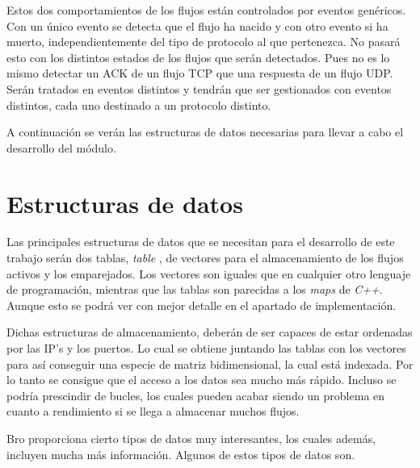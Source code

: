 \intro Estos dos comportamientos de los flujos están controlados por eventos genéricos. Con un único evento se 
detecta que el flujo ha nacido y con otro evento si ha muerto, independientemente del tipo de protocolo al que 
pertenezca. No pasará esto con los distintos estados de los flujos que serán detectados. Pues no es lo mismo 
detectar un ACK de un flujo TCP que una respuesta de un flujo UDP. Serán tratados en eventos distintos y tendrán que ser gestionados con eventos distintos, cada uno destinado a un protocolo distinto. 

\intro A continuación se verán las estructuras de datos necesarias para llevar a cabo el desarrollo del módulo.

\section{Estructuras de datos}

Las principales estructuras de datos que se necesitan para el desarrollo de este trabajo serán dos 
tablas, \textit{table} \cite{brotable}, de vectores para el almacenamiento de los flujos activos y los emparejados. 
Los vectores son iguales que en cualquier otro lenguaje de programación, mientras que las tablas son parecidas a los \textit{maps} de \textit{C++}. Aunque esto se podrá ver con mejor detalle en el apartado de implementación.

\intro Dichas estructuras de almacenamiento, deberán de ser capaces de estar ordenadas por las IP's y los puertos. 
Lo cual se obtiene juntando las tablas con los vectores para así conseguir una especie de matriz bidimensional, 
la cual está indexada. Por lo tanto se consigue que el acceso a los datos sea mucho más rápido. Incluso se podría 
prescindir de bucles, los cuales pueden acabar siendo un problema en cuanto a rendimiento si se llega a almacenar 
muchos flujos.

\intro Bro proporciona cierto tipos de datos muy interesantes, los cuales además, incluyen mucha más información. 
Algunos de estos tipos de datos son. 

